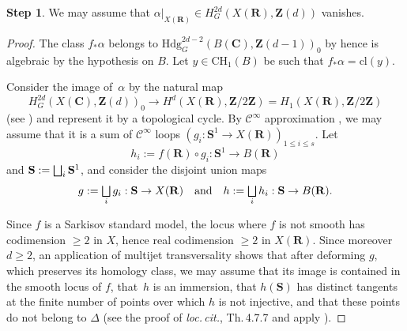 \documentclass[JEP,XML,SOM,Unicode]{cedram}
\let\oldbigsqcup\bigsqcup
\renewcommand{\bigsqcup}{\mathop{\textstyle\oldbigsqcup}\displaylimits}
\theoremstyle{plain}
\theoremstyle{definition}
\newtheorem{Step}{Step}
\numberwithin{equation}{section}
\newcommand{\cl}{{\mathrm{cl}}}
\renewcommand{\C}{{\mathbf C}}
\newcommand{\R}{{\mathbf R}}
\newcommand{\Z}{{\mathbf Z}}
\newcommand{\CH}{\mathrm{CH}}
\newcommand{\Hdg}{\mathrm{Hdg}}
\newcommand{\bS}{{\mathbf S}}
\newcommand{\ci}{\mathscr{C}^{\infty}}
\begin{document}
\begin{Step}
\label{step:real locus1}
We may assume that $\alpha|_{X(\R)}\in H^{2d}_G(X(\R),\Z(d))$ vanishes.
\end{Step}

\begin{proof}
The class $f_*\alpha$ belongs to $\Hdg^{2d-2}_G(B(\C),\Z(d-1))_0$ by \cite[Th.\,\ref*{BW1-th:stability of topological constraints}]{BW1}
hence is algebraic by the hypothesis on $B$. Let $y\in \CH_1(B)$ be such that $f_*\alpha=\cl(y)$.

Consider the image of~$\alpha$ by the natural map
\[
H^{2d}_G(X(\C),\Z(d))_0 \to H^d(X(\R),\Z/2\Z)=H_1(X(\R),\Z/2\Z)
\]
(see \cite[(\ref*{BW1-eq:psi with point})]{BW1}) and represent it by a topological cycle. By $\ci$ approximation \cite[Ch.\,2, Th.\,2.6]{Hirsch}, we may assume that it is a sum of $\ci$ loops \hbox{$(g_i:\bS^1\to X(\R))_{1\leq i\leq s}$}.
Let
\[
h_i:=f(\R)\circ g_i:\bS^1\to B(\R)
\]
and $\bS:=\bigsqcup_i\bS^1$, and consider the disjoint union maps
\[
g:=\bigsqcup_i g_i:\bS\to X(\R)\quad\text{and}\quad h:=\bigsqcup_i h_i:\bS\to B(\R).
\]

Since $f$ is a Sarkisov standard model, the locus where $f$ is not smooth has codimension $\geq 2$ in $X$, hence real codimension $\geq 2$ in $X(\R)$.
Since moreover $d\geq 2$, an application of multijet transversality \cite[Th.\,4.6.1]{Wall} shows that
after deforming $g$, which preserves its homology class, we may assume that its image is contained in the smooth locus of $f$, that~$h$ is an immersion,
that $h(\bS)$ has distinct tangents at the finite number of points over which $h$ is not injective, and that these points do not belong to $\Delta$
(see the proof of \emph{loc.\,cit.}, Th.\,4.7.7 and apply \cite[Th.\,21.5\,(5)]{michorbook}).


\end{proof}
\end{document}
